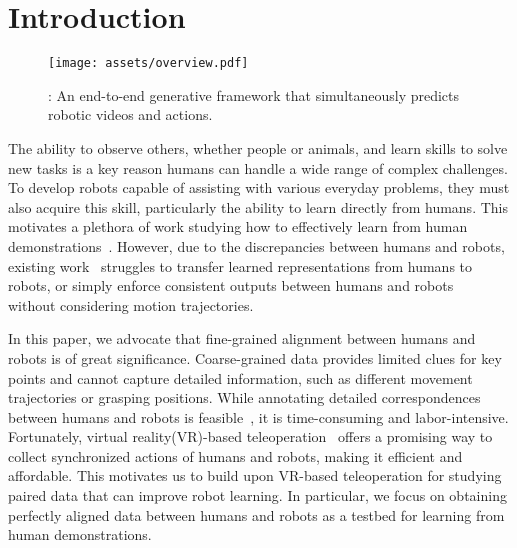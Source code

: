 \section{Introduction}
\label{sec:intro}

\begin{figure}[t]
\centering
\texttt{[image: assets/overview.pdf]}
\caption{\system: An end-to-end generative framework that simultaneously predicts robotic videos and actions.} 
\vspace{-1.2em}
\label{fig:overview}
\vspace{-0.4em}
\end{figure}
The ability to observe others, whether people or animals, and learn skills to solve new tasks is a key reason humans can handle a wide range of complex challenges. To develop robots capable of assisting with various everyday problems, they must also acquire this skill, particularly the ability to learn directly from humans. This motivates a plethora of work studying how to effectively learn from human demonstrations~\cite{bahl2023affordances,srirama2024hrp,nair2022rm,wang2023mimicplay,bahl2022human,smith2019avid}. 
However, due to the discrepancies between humans and robots, existing work~\cite{wang2023mimicplay,nair2022rm,zeng2024learning} struggles to transfer learned representations from humans to robots, or simply enforce consistent outputs between humans and robots~\cite{bahl2022human} without considering motion trajectories.

In this paper, we advocate that fine-grained alignment between humans and robots is of great significance. Coarse-grained data provides limited clues for key points and cannot capture detailed information, such as different movement trajectories or grasping positions. While annotating detailed correspondences between humans and robots is feasible~\cite{jain2024vid2robot,liu2018imitation}, it is time-consuming and labor-intensive. Fortunately, virtual reality(VR)-based teleoperation~\cite{iyer2024open,ding2024bunny,qin2023anyteleop,cheng2024open} offers a promising way to collect synchronized actions of humans and robots, making it efficient and affordable. This motivates us to build upon VR-based teleoperation for studying paired data that can improve robot learning. In particular, we focus on obtaining perfectly aligned data between humans and robots as a testbed for learning from human demonstrations.

